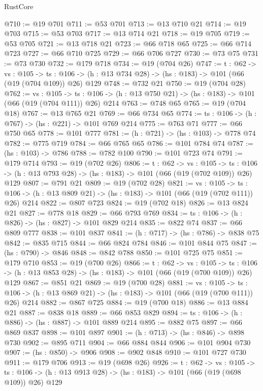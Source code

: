 \begin{lexlean}{RustCore}
\begin{coremodule}
@710 := @19 @701
@711 := @53 @701
@713 := @13 @710 @21
@714 := @19 @703
@715 := @53 @703
@717 := @13 @714 @21
@718 := @19 @705
@719 := @53 @705
@721 := @13 @718 @21
@723 := @66 @718 @65
@725 := @66 @714 @723
@727 := @66 @710 @725
@729 := @66 @706 @727
@730 := @73 @75
@731 := @73 @730
@732 := @179 @718
@734 := @19 (@704 @26)
@747 := {t : @62} ->
  {vs : @105} ->
  {ts : @106} -> (h : @13 @734 @28) -> (hs : @183) -> @101 (@66 (@19 (@704 @109)) @26) @129
@748 := @732 @21
@750 := @19 (@704 @28)
@762 := {vs : @105} ->
  {ts : @106} -> (h : @13 @750 @21) -> (hs : @183) -> @101 (@66 (@19 (@704 @111)) @26) @214
@763 := @748 @65
@765 := @19 (@704 @18)
@767 := @13 @765 @21
@769 := @66 @734 @65
@774 := {ts : @106} -> (h : @767) -> (hs : @221) -> @101 @769 @214
@775 := @763 @71
@777 := @66 @750 @65
@778 := @101 @777
@781 := (h : @721) -> (hs : @103) -> @778 @74
@782 := @775 @719
@784 := @66 @765 @65
@786 := @101 @784 @74
@787 := (hs : @103) -> @786
@788 := @782 @100
@790 := @101 @723 @74
@791 := @179 @714
@793 := @19 (@702 @26)
@806 := {t : @62} ->
  {vs : @105} ->
  {ts : @106} -> (h : @13 @793 @28) -> (hs : @183) -> @101 (@66 (@19 (@702 @109)) @26) @129
@807 := @791 @21
@809 := @19 (@702 @28)
@821 := {vs : @105} ->
  {ts : @106} -> (h : @13 @809 @21) -> (hs : @183) -> @101 (@66 (@19 (@702 @111)) @26) @214
@822 := @807 @723
@824 := @19 (@702 @18)
@826 := @13 @824 @21
@827 := @778 @18
@829 := @66 @793 @769
@834 := {ts : @106} -> (h : @826) -> (hs : @827) -> @101 @829 @214
@835 := @822 @74
@837 := @66 @809 @777
@838 := @101 @837
@841 := (h : @717) -> (hs : @786) -> @838 @75
@842 := @835 @715
@844 := @66 @824 @784
@846 := @101 @844 @75
@847 := (hs : @790) -> @846
@848 := @842 @788
@850 := @101 @725 @75
@851 := @179 @710
@853 := @19 (@700 @26)
@866 := {t : @62} ->
  {vs : @105} ->
  {ts : @106} -> (h : @13 @853 @28) -> (hs : @183) -> @101 (@66 (@19 (@700 @109)) @26) @129
@867 := @851 @21
@869 := @19 (@700 @28)
@881 := {vs : @105} ->
  {ts : @106} -> (h : @13 @869 @21) -> (hs : @183) -> @101 (@66 (@19 (@700 @111)) @26) @214
@882 := @867 @725
@884 := @19 (@700 @18)
@886 := @13 @884 @21
@887 := @838 @18
@889 := @66 @853 @829
@894 := {ts : @106} -> (h : @886) -> (hs : @887) -> @101 @889 @214
@895 := @882 @75
@897 := @66 @869 @837
@898 := @101 @897
@901 := (h : @713) -> (hs : @846) -> @898 @730
@902 := @895 @711
@904 := @66 @884 @844
@906 := @101 @904 @730
@907 := (hs : @850) -> @906
@908 := @902 @848
@910 := @101 @727 @730
@911 := @179 @706
@913 := @19 (@698 @26)
@926 := {t : @62} ->
  {vs : @105} ->
  {ts : @106} -> (h : @13 @913 @28) -> (hs : @183) -> @101 (@66 (@19 (@698 @109)) @26) @129

\end{coremodule}
\end{lexlean}
